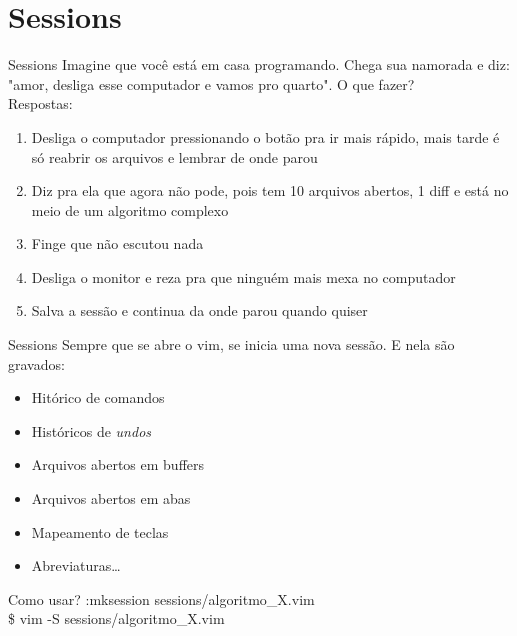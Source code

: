 \section{Sessions}
\begin{frame}{Sessions}
	Imagine que você está em casa programando. Chega sua namorada e diz: "amor, desliga esse computador e vamos pro quarto". O que fazer?\\
	\pause \large Respostas:
	\begin{enumerate}
		\item Desliga o computador pressionando o botão pra ir mais rápido, mais tarde é só reabrir os arquivos e lembrar de onde parou
		\pause \item Diz pra ela que agora não pode, pois tem 10 arquivos abertos, 1 diff e está no meio de um algoritmo complexo
		\pause \item Finge que não escutou nada
		\pause \item Desliga o monitor e reza pra que ninguém mais mexa no computador
		\pause \item Salva a sessão e continua da onde parou quando quiser
	\end{enumerate}
\end{frame}
\begin{frame}{Sessions}
	Sempre que se abre o vim, se inicia uma nova sessão. E nela são gravados:
	\begin{itemize}
		\item Hitórico de comandos
		\item Históricos de \textit{undos}
		\item Arquivos abertos em buffers
		\item Arquivos abertos em abas
		\item Mapeamento de teclas
		\item Abreviaturas\ldots
	\end{itemize}
	\begin{block}{Como usar?}
		:mksession sessions/algoritmo\_X.vim \\
		\$ vim -S sessions/algoritmo\_X.vim
	\end{block}
\end{frame}
